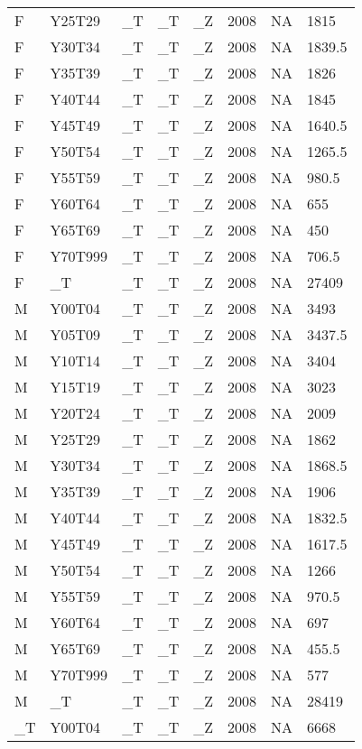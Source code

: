 \begin{longtable}[t]{llllllll}
F & Y25T29 & \_T & \_T & \_Z & 2008 & NA & 1815\\
\addlinespace
F & Y30T34 & \_T & \_T & \_Z & 2008 & NA & 1839.5\\
F & Y35T39 & \_T & \_T & \_Z & 2008 & NA & 1826\\
F & Y40T44 & \_T & \_T & \_Z & 2008 & NA & 1845\\
F & Y45T49 & \_T & \_T & \_Z & 2008 & NA & 1640.5\\
F & Y50T54 & \_T & \_T & \_Z & 2008 & NA & 1265.5\\
\addlinespace
F & Y55T59 & \_T & \_T & \_Z & 2008 & NA & 980.5\\
F & Y60T64 & \_T & \_T & \_Z & 2008 & NA & 655\\
F & Y65T69 & \_T & \_T & \_Z & 2008 & NA & 450\\
F & Y70T999 & \_T & \_T & \_Z & 2008 & NA & 706.5\\
F & \_T & \_T & \_T & \_Z & 2008 & NA & 27409\\
\addlinespace
M & Y00T04 & \_T & \_T & \_Z & 2008 & NA & 3493\\
M & Y05T09 & \_T & \_T & \_Z & 2008 & NA & 3437.5\\
M & Y10T14 & \_T & \_T & \_Z & 2008 & NA & 3404\\
M & Y15T19 & \_T & \_T & \_Z & 2008 & NA & 3023\\
M & Y20T24 & \_T & \_T & \_Z & 2008 & NA & 2009\\
\addlinespace
M & Y25T29 & \_T & \_T & \_Z & 2008 & NA & 1862\\
M & Y30T34 & \_T & \_T & \_Z & 2008 & NA & 1868.5\\
M & Y35T39 & \_T & \_T & \_Z & 2008 & NA & 1906\\
M & Y40T44 & \_T & \_T & \_Z & 2008 & NA & 1832.5\\
M & Y45T49 & \_T & \_T & \_Z & 2008 & NA & 1617.5\\
\addlinespace
M & Y50T54 & \_T & \_T & \_Z & 2008 & NA & 1266\\
M & Y55T59 & \_T & \_T & \_Z & 2008 & NA & 970.5\\
M & Y60T64 & \_T & \_T & \_Z & 2008 & NA & 697\\
M & Y65T69 & \_T & \_T & \_Z & 2008 & NA & 455.5\\
M & Y70T999 & \_T & \_T & \_Z & 2008 & NA & 577\\
\addlinespace
M & \_T & \_T & \_T & \_Z & 2008 & NA & 28419\\
\_T & Y00T04 & \_T & \_T & \_Z & 2008 & NA & 6668\\

\end{longtable}
